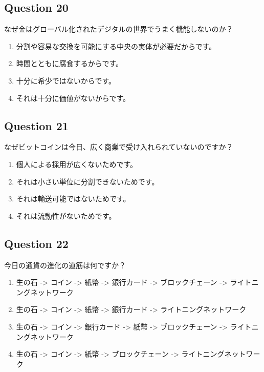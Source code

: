 \documentclass[12pt,a4paper]{article}
\begin{document}
\bigskip


\subsection*{Question 20}
なぜ金はグローバル化されたデジタルの世界でうまく機能しないのか？

\begin{enumerate}[label=\Alph*., leftmargin=*]
\item 分割や容易な交換を可能にする中央の実体が必要だからです。
\item 時間とともに腐食するからです。
\item 十分に希少ではないからです。
\item それは十分に価値がないからです。
\end{enumerate}

\bigskip


\subsection*{Question 21}
なぜビットコインは今日、広く商業で受け入れられていないのですか？

\begin{enumerate}[label=\Alph*., leftmargin=*]
\item 個人による採用が広くないためです。
\item それは小さい単位に分割できないためです。
\item それは輸送可能ではないためです。
\item それは流動性がないためです。
\end{enumerate}

\bigskip


\subsection*{Question 22}
今日の通貨の進化の道筋は何ですか？

\begin{enumerate}[label=\Alph*., leftmargin=*]
\item 生の石 -> コイン -> 紙幣 -> 銀行カード -> ブロックチェーン -> ライトニングネットワーク
\item 生の石 -> コイン -> 紙幣 -> 銀行カード -> ライトニングネットワーク
\item 生の石 -> コイン -> 銀行カード -> 紙幣 -> ブロックチェーン -> ライトニングネットワーク
\item 生の石 -> コイン -> 紙幣 -> ブロックチェーン -> ライトニングネットワーク
\end{enumerate}
\end{document}
